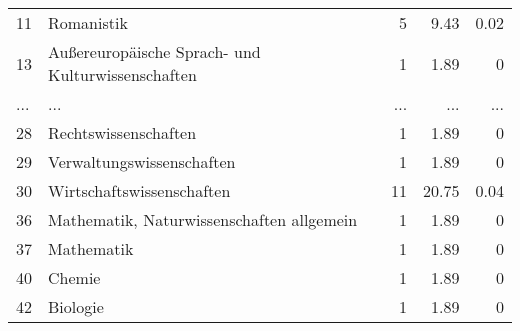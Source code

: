 \begin{longtable}{lXrrr}
        11 & \multicolumn{1}{X}{Romanistik} & %
          \num{5} &
          \num[round-mode=places,round-precision=2]{9,43} &
          \num[round-mode=places,round-precision=2]{0,02} \\
        13 & \multicolumn{1}{X}{Außereuropäische Sprach- und Kulturwissenschaften} & %
          \num{1} &
          \num[round-mode=places,round-precision=2]{1,89} &
          \num[round-mode=places,round-precision=2]{0} \\
       ... & ... & ... & ... & ... \\
        28 & \multicolumn{1}{X}{Rechtswissenschaften} & %
          \num{1} &
          \num[round-mode=places,round-precision=2]{1,89} &
          \num[round-mode=places,round-precision=2]{0} \\

        29 & \multicolumn{1}{X}{Verwaltungswissenschaften} & %
          \num{1} &
          \num[round-mode=places,round-precision=2]{1,89} &
          \num[round-mode=places,round-precision=2]{0} \\

        30 & \multicolumn{1}{X}{Wirtschaftswissenschaften} & %
          \num{11} &
          \num[round-mode=places,round-precision=2]{20,75} &
          \num[round-mode=places,round-precision=2]{0,04} \\

        36 & \multicolumn{1}{X}{Mathematik, Naturwissenschaften allgemein} & %
          \num{1} &
          \num[round-mode=places,round-precision=2]{1,89} &
          \num[round-mode=places,round-precision=2]{0} \\

        37 & \multicolumn{1}{X}{Mathematik} & %
          \num{1} &
          \num[round-mode=places,round-precision=2]{1,89} &
          \num[round-mode=places,round-precision=2]{0} \\

        40 & \multicolumn{1}{X}{Chemie} & %
          \num{1} &
          \num[round-mode=places,round-precision=2]{1,89} &
          \num[round-mode=places,round-precision=2]{0} \\

        42 & \multicolumn{1}{X}{Biologie} & %
          \num{1} &
          \num[round-mode=places,round-precision=2]{1,89} &
          \num[round-mode=places,round-precision=2]{0} \\


\end{longtable}
